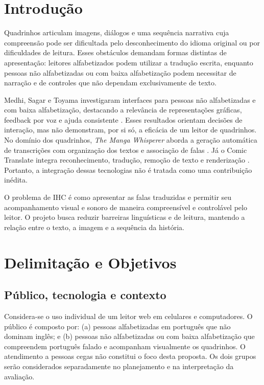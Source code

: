 \documentclass[conference]{IEEEtran}
\begin{document}
\section{Introdução}
Quadrinhos articulam imagens, diálogos e uma sequência narrativa cuja compreensão pode ser dificultada pelo desconhecimento do idioma original ou por dificuldades de leitura. Esses obstáculos demandam formas distintas de apresentação: leitores alfabetizados podem utilizar a tradução escrita, enquanto pessoas não alfabetizadas ou com baixa alfabetização podem necessitar de narração e de controles que não dependam exclusivamente de texto.

Medhi, Sagar e Toyama investigaram interfaces para pessoas não alfabetizadas e com baixa alfabetização, destacando a relevância de representações gráficas, feedback por voz e ajuda consistente \cite{medhi2007}. Esses resultados orientam decisões de interação, mas não demonstram, por si só, a eficácia de um leitor de quadrinhos. No domínio dos quadrinhos, \emph{The Manga Whisperer} aborda a geração automática de transcrições com organização dos textos e associação de falas \cite{sachdeva2024}. Já o Comic Translate integra reconhecimento, tradução, remoção de texto e renderização \cite{comictranslate}. Portanto, a integração dessas tecnologias não é tratada como uma contribuição inédita.

O problema de IHC é como apresentar as falas traduzidas e permitir seu acompanhamento visual e sonoro de maneira compreensível e controlável pelo leitor. O projeto busca reduzir barreiras linguísticas e de leitura, mantendo a relação entre o texto, a imagem e a sequência da história.

\section{Delimitação e Objetivos}
\subsection{Público, tecnologia e contexto}
Considera-se o uso individual de um leitor web em celulares e computadores. O público é composto por: (a) pessoas alfabetizadas em português que não dominam inglês; e (b) pessoas não alfabetizadas ou com baixa alfabetização que compreendem português falado e acompanham visualmente os quadrinhos. O atendimento a pessoas cegas não constitui o foco desta proposta. Os dois grupos serão considerados separadamente no planejamento e na interpretação da avaliação.
\end{document}
